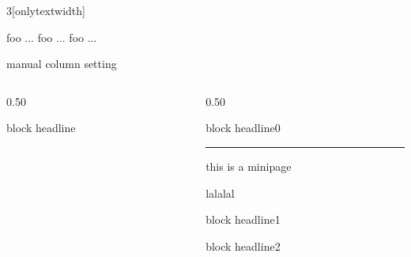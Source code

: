 \documentclass[final]{beamer}
\begin{document}
\begin{frame}[t]
\begin{multicols}{3}[onlytextwidth]
\lipsum[2]


\lipsum[3]

\lipsum[4]

\lipsum[5-8]


foo ...
foo ...
foo ...

\end{multicols}
\end{frame}

\begin{frame}{manual column setting}
\begin{columns}

\begin{column}{0.50\textwidth}
\begin{block}{block headline}
\lipsum
\end{block}
\end{column}

\begin{column}{0.50\textwidth}
\begin{block}{block headline0}
\lipsum[1]
\end{block}

\begin{minipage}[c]{.65\textwidth}
\hrule
this is a 
minipage

lalalal
\end{minipage}

\begin{block}{block headline1}
\lipsum[1]
\end{block}

\begin{block}{block headline2}
\lipsum[2]
\end{block}


\end{column}
\end{columns}

\end{frame}
\end{document}

